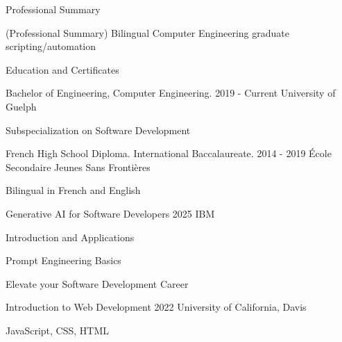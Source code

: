 \documentclass{resume}
\begin{document}
    \begin{rSection}{Professional Summary}
        \begin{center}
            (Professional Summary) Bilingual Computer Engineering graduate scripting/automation
        \end{center}

    \end{rSection}

    \begin{rSection}{Education and Certificates}
        \begin{rSubsection}
        {Bachelor of Engineering, Computer Engineering.}            {2019 - Current}
        {University of Guelph}                                      {}
            \item Subspecialization on Software Development
        \end{rSubsection}
        
        \begin{rSubsection}
        {French High School Diploma. International Baccalaureate.}  {2014 - 2019}
        {École Secondaire Jeunes Sans Frontières}                   {}  
            \item Bilingual in French and English
        \end{rSubsection}
        
        \begin{rSubsection}
        {Generative AI for Software Developers}                     {2025}
        {IBM}                                                       {}
            \item Introduction and Applications
            \item Prompt Engineering Basics
            \item Elevate your Software Development Career
        \end{rSubsection}
        
        \begin{rSubsection}
        {Introduction to Web Development}                           {2022}
        {University of California, Davis}                           {}
         \item JavaScript, CSS, HTML
        \end{rSubsection}
    \end{rSection}
\end{document}
